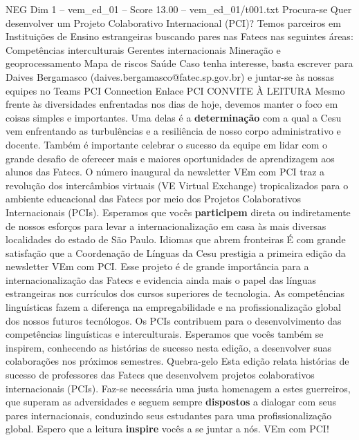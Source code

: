 \begin{textsample}{NEG Dim 1 – vem\_ed\_01 – Score 13.00 – vem\_ed\_01/t001.txt}  \label{ex:f1_neg_096}
Procura-se Quer desenvolver um Projeto Colaborativo Internacional (PCI)?
Temos parceiros em Instituições de Ensino estrangeiras buscando pares nas Fatecs nas seguintes áreas: Competências interculturais Gerentes internacionais Mineração e geoprocessamento Mapa de riscos Saúde Caso tenha interesse, basta escrever para Daives Bergamasco (daives.bergamasco@fatec.sp.gov.br) e juntar-se às nossas equipes no Teams PCI Connection Enlace PCI CONVITE À LEITURA Mesmo frente às diversidades enfrentadas nos dias de hoje, devemos manter o foco em coisas simples e importantes.
Uma delas é a \textbf{determinação} com a qual a Cesu vem enfrentando as turbulências e a resiliência de nosso corpo administrativo e docente.
Também é importante celebrar o sucesso da equipe em lidar com o grande desafio de oferecer mais e maiores oportunidades de aprendizagem aos alunos das Fatecs.
O número inaugural da newsletter VEm com PCI traz a revolução dos intercâmbios virtuais (VE Virtual Exchange) tropicalizados para o ambiente educacional das Fatecs por meio dos Projetos Colaborativos Internacionais (PCIs).
Esperamos que vocês \textbf{participem} direta ou indiretamente de nossos esforços para levar a internacionalização em casa às mais diversas localidades do estado de São Paulo.
Idiomas que abrem fronteiras É com grande satisfação que a Coordenação de Línguas da Cesu prestigia a primeira edição da newsletter VEm com PCI.
Esse projeto é de grande importância para a internacionalização das Fatecs e evidencia ainda mais o papel das línguas estrangeiras nos currículos dos cursos superiores de tecnologia.
As competências linguísticas fazem a diferença na empregabilidade e na profissionalização global dos nossos futuros tecnólogos.
Os PCIs contribuem para o desenvolvimento das competências linguísticas e interculturais.
Esperamos que vocês também se inspirem, conhecendo as histórias de sucesso nesta edição, a desenvolver suas colaborações nos próximos semestres.
Quebra-gelo Esta edição relata histórias de sucesso de professores das Fatecs que desenvolvem projetos colaborativos internacionais (PCIs).
Faz-se necessária uma justa homenagem a estes guerreiros, que superam as adversidades e seguem sempre \textbf{dispostos} a dialogar com seus pares internacionais, conduzindo seus estudantes para uma profissionalização global.
Espero que a leitura \textbf{inspire} vocês a se juntar a nós.
VEm com PCI!

\end{textsample}
